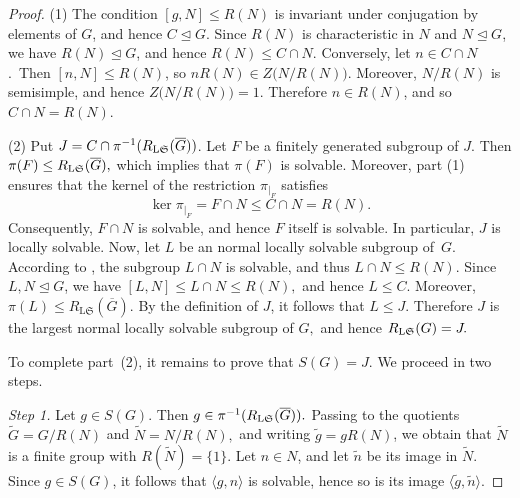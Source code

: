 \documentclass[11pt, reqno]{amsart}
\numberwithin{equation}{section}
\theoremstyle{definition}
\numberwithin{equation}{section}
\begin{document}
\begin{proof}
(1)
The condition $[g,N]\leq R(N)$ is invariant under conjugation by elements
of $G$, and hence $C\trianglelefteq G$. Since $R(N)$ is characteristic in
$N$ and $N\trianglelefteq G$, we have $R(N)\trianglelefteq G$, and hence $R(N)\leq C\cap N.$ Conversely, let $n\in C\cap N$.~Then $[n,N]\leq R(N)$, so $nR(N)\in Z\bigl(N/R(N)\bigr).$  Moreover, $N/R(N)$ is semisimple, and hence
$Z\bigl(N/R(N)\bigr)=1.$ Therefore $n\in R(N)$, and so $C\cap N=R(N).$

\medskip
(2) Put  $J=C\cap \pi^{-1}(R_{\textup{L}\mathfrak{S}}(\overline{G}))$. Let $F$ be a finitely generated subgroup of $J$. Then $\pi(F)\leq R_{\textup{L}\mathfrak{S}}(\overline{G}),$ which implies that $\pi(F)$ is solvable. Moreover, part (1) ensures that the kernel of the restriction $\pi_{|_F}$ satisfies
$$\ker\pi_{|_F} = F \cap N \leq C \cap N = R(N).$$ 
Consequently, $F \cap N$ is solvable, and hence $F$ itself is solvable. In particular, $J$ is locally solvable. Now, let $L$ be an normal locally solvable subgroup of~$G$. According to \cite[Lemma~2.5]{CNH2025}, the subgroup $L \cap N$ is solvable, and thus $L \cap N \leq R(N) $. Since $L,N\trianglelefteq G$, we have $[L,N]\leq L\cap N\leq R(N),$ and hence $L\leq C$. Moreover, $\pi(L)\leq R_{\mathrm{L}\mathfrak S}(\overline G).$ By the definition of $J$, it follows that $L\leq J$. Therefore $J$ is the largest normal locally solvable subgroup of $G,$ and hence $R_{\textup{L}\mathfrak{S}}(G) = J.$

\medskip

To complete part~\textup{(2)}, it remains to prove that $S(G)=J$. We proceed in two steps.

\smallskip
\emph{Step 1.} Let $g \in S(G)$. Then $g \in \pi^{-1}(R_{\textup{L}\mathfrak{S}}(\overline{G})).$ Passing to the quotients $ \widetilde{G} = G/R(N)$ and $\widetilde{N} = N/R(N),$ and writing $ \widetilde{g} = gR(N)$, we obtain that $\widetilde{N}$ is a finite group with $R(\widetilde{N}) = \{1\}.$
Let $n \in N$, and let $\widetilde{n}$ be its image in $\widetilde{N}$. Since $g \in S(G)$, it follows that $\langle g, n \rangle$ is solvable, hence so is its image $\langle \widetilde{g}, \widetilde{n} \rangle$.


\end{proof}
\end{document}
